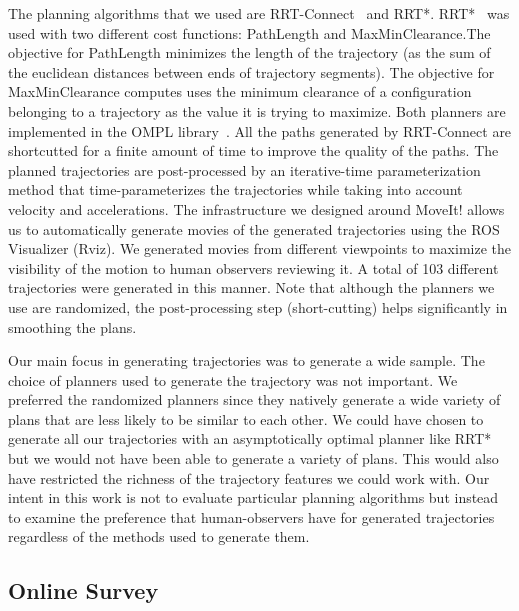 \documentclass[letterpaper, 10 pt, conference]{ieeeconf}  %
\begin{document}
The planning algorithms that we used are RRT-Connect~\cite{kuffner2000rrt} and RRT*.  RRT*~\cite{frazzoli-RRTstar} was used with two different cost functions: PathLength and MaxMinClearance.The objective for PathLength minimizes the length of the trajectory (as the sum of the euclidean distances between ends of trajectory segments). The objective for MaxMinClearance computes uses the minimum clearance of a configuration belonging to a trajectory as the value it is trying to maximize. Both planners are implemented in the OMPL library~\cite{OMPL:2012}. All the paths generated by RRT-Connect are shortcutted for a finite amount of time to improve the quality of the paths. The planned trajectories are post-processed by an iterative-time parameterization method that time-parameterizes the trajectories while taking into account velocity and accelerations. The infrastructure we designed around MoveIt! allows us to automatically generate movies of the generated trajectories using the ROS Visualizer (Rviz). We generated movies from different viewpoints to maximize the visibility of the motion to human observers reviewing it. A total of 103 different trajectories were generated in this manner. Note that although the planners we use are randomized, the post-processing step (short-cutting) helps significantly in smoothing the plans. 

Our main focus in generating trajectories was to generate a wide sample. The choice of planners used to generate the trajectory was not important. We preferred the randomized planners since they natively generate a wide variety of plans that are less likely to be similar to each other. We could have chosen to generate all our trajectories with an  asymptotically optimal planner like RRT* but we would not have been able to generate a variety of plans. This would also have restricted the richness of the trajectory features we could work with. Our intent in this work is not to evaluate particular planning algorithms but instead to examine the preference that human-observers have for generated trajectories regardless of the methods used to generate them. 

\subsection{Online Survey}
\end{document}
